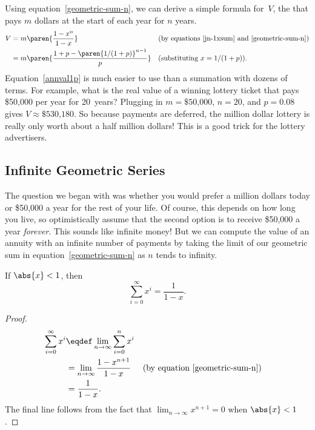 Using equation~\ref{geometric-sum-n}, we can derive a simple formula
for~$V$, the  that pays $m$ dollars at the
start of each year for $n$ years.
\begin{align}
  V & = m \paren{\frac{1 - x^n}{1-x}}
      && \text{(by equations~\ref{jn-1xsum} and~\ref{geometric-sum-n})}\label{Vmfrac1x}\\
  & = m \paren{\frac{1 + p - \paren{1/(1+p)}^{n-1}}{p}}
      && \text{(substituting $x = 1/(1+p)$)}.\label{annval1p}
\end{align}
Equation~\ref{annval1p} is much easier to use than a summation with
dozens of terms.  For example, what is the real value of a winning
lottery ticket that pays \$50,000 per year for 20~years?  Plugging in
$m = \text{\$50,000}$, $n = 20$, and $p = 0.08$ gives $V \approx
\text{\$530,180}$.  So because payments are deferred, the million
dollar lottery is really only worth about a half million dollars!
This is a good trick for the lottery advertisers.

\subsection{Infinite Geometric Series}

The question we began with was whether you would prefer a million
dollars today or \$50,000 a year for the rest of your life.  Of
course, this depends on how long you live, so optimistically assume
that the second option is to receive \$50,000 a year \emph{forever}.
This sounds like infinite money!  But we can compute the value of an
annuity with an infinite number of payments by taking the limit of our
geometric sum in equation~\ref{geometric-sum-n} as $n$ tends to
infinity.
\begin{theorem}\label{th:series}
If $\abs{x} < 1$, then
\[
\sum_{i=0}^\infty x^i = \frac{1}{1-x}.
\]
\end{theorem}

\begin{proof}
\begin{align*}
\sum_{i=0}^\infty x^i
   & \eqdef  \lim_{n \rightarrow \infty} \sum_{i=0}^{n} x^i \\
   & = \lim_{n \rightarrow \infty} \frac{1 - x^{n+1}}{1-x}
        & & \text{(by equation~\ref{geometric-sum-n})}\\
   & = \frac{1}{1-x}.
\end{align*}
The final line follows from the fact that $\lim_{n \rightarrow \infty}
x^{n+1} =0$ when $\abs{x} < 1$.
\end{proof}


